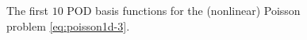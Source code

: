 \documentclass[12pt, a4paper, twoside, openright, notitlepage]{report}
\numberwithin{equation}{chapter}
\theoremstyle{theorem}
\theoremstyle{definition}
\theoremstyle{remark}
\theoremstyle{proposition}
\numberwithin{figure}{chapter}
\begin{document}
\begin{figure}[H]
			
			\caption{The first $10$ POD basis functions for the (nonlinear) Poisson problem \eqref{eq:poisson1d-3}.}
			\label{fig:poisson1d-3-fig1}
		\end{figure}
		
		\vspace*{-0.4cm}
		
\end{document}

